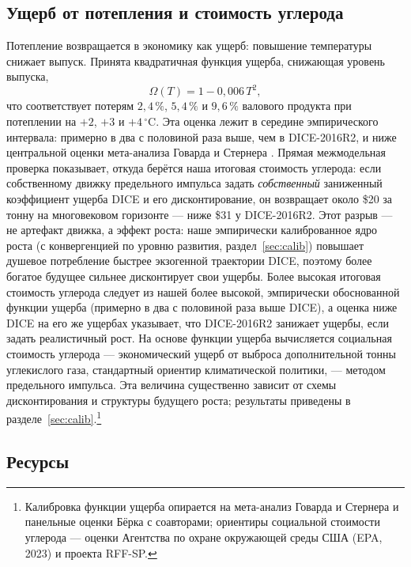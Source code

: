 \documentclass[11pt,a4paper]{article}
\begin{document}
\subsection{Ущерб от потепления и стоимость углерода}

Потепление возвращается в экономику как ущерб: повышение температуры снижает выпуск.
Принята квадратичная функция ущерба, снижающая уровень выпуска,
\begin{equation}
\Omega(T) = 1 - 0{,}006\,T^{2},
\label{eq:damage}
\end{equation}
что соответствует потерям $2{,}4\,\%$, $5{,}4\,\%$ и $9{,}6\,\%$ валового продукта при
потеплении на $+2$, $+3$ и $+4\,^\circ$C. Эта оценка лежит в середине эмпирического
интервала: примерно в два с половиной раза выше, чем в DICE-2016R2, и ниже центральной
оценки мета-анализа Говарда и Стернера \citep{howard2017,burke2015}. Прямая межмодельная проверка
показывает, откуда берётся наша итоговая стоимость углерода: если собственному движку предельного
импульса задать \emph{собственный} заниженный коэффициент ущерба DICE и его дисконтирование, он
возвращает около \$20 за тонну на многовековом горизонте --- ниже \$31 у DICE-2016R2. Этот разрыв ---
не артефакт движка, а эффект роста: наше эмпирически калиброванное ядро роста (с конвергенцией по
уровню развития, раздел~\ref{sec:calib}) повышает душевое потребление быстрее экзогенной траектории
DICE, поэтому более богатое будущее сильнее дисконтирует свои ущербы. Более высокая итоговая
стоимость углерода следует из нашей более высокой, эмпирически обоснованной функции ущерба (примерно
в два с половиной раза выше DICE), а оценка ниже DICE на его же ущербах указывает, что DICE-2016R2
занижает ущербы, если задать реалистичный рост. На основе функции
ущерба вычисляется социальная стоимость углерода --- экономический ущерб от выброса
дополнительной тонны углекислого газа, стандартный ориентир климатической политики, ---
методом предельного импульса. Эта величина существенно зависит от схемы дисконтирования
и структуры будущего роста; результаты приведены в разделе~\ref{sec:calib}.\footnote{Калибровка
функции ущерба опирается на мета-анализ Говарда и Стернера и панельные оценки Бёрка с
соавторами; ориентиры социальной стоимости углерода --- оценки Агентства по охране окружающей
среды США (EPA, 2023) и проекта RFF-SP.}

\subsection{Ресурсы}
\end{document}
